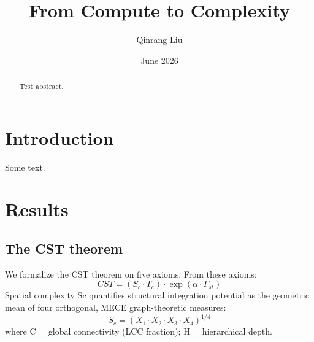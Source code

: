 \documentclass[a4paper,12pt]{article}
\title{From Compute to Complexity}
\author{Qinrang Liu}
\date{June 2026}
\begin{document}
\maketitle
\begin{abstract}
Test abstract.
\end{abstract}
\section{Introduction}
Some text.
\section{Results}
\subsection{The CST theorem}
We formalize the CST theorem on five axioms.
From these axioms:
\begin{equation}
CST = (S_c \cdot T_c) \cdot \exp(\alpha \cdot \Gamma_{st}) \tag{1}
\end{equation}
Spatial complexity Sc quantifies structural integration potential as the geometric mean of four orthogonal, MECE graph-theoretic measures:
\begin{equation}
S_c = (X_1 \cdot X_2 \cdot X_3 \cdot X_4)^{1/4} \tag{2}
\end{equation}
where C = global connectivity (LCC fraction); H = hierarchical depth.
\end{document}
